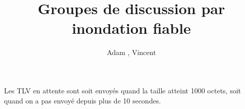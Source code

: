 \documentclass[12pt,a4paper]{article}
\title{Groupes de discussion par inondation fiable}
\author{Adam \bsc{Phillips}, Vincent \bsc{Bonczak}}
\begin{document}
  \maketitle
	
	
	Les TLV en attente sont soit envoyés quand la taille atteint 1000 octets, soit quand on a pas envoyé depuis plus de 10 secondes.
\end{document}

